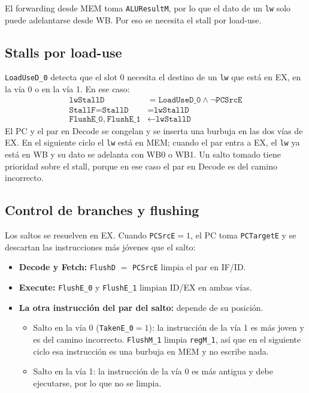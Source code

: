 \documentclass[12pt,a4paper]{article}
\begin{document}
El forwarding desde MEM toma \texttt{ALUResultM}, por lo que el dato de un \texttt{lw} solo puede adelantarse desde WB. Por eso se necesita el stall por load-use.

\subsection{Stalls por load-use}

\texttt{LoadUseD\_0} detecta que el slot 0 necesita el destino de un \texttt{lw} que está en EX, en la vía 0 o en la vía 1. En ese caso:
\begin{align}
\texttt{lwStallD} &= \texttt{LoadUseD\_0} \land \lnot\texttt{PCSrcE} \\
\texttt{StallF} = \texttt{StallD} &= \texttt{lwStallD} \\
\texttt{FlushE\_0},\ \texttt{FlushE\_1} &\leftarrow \texttt{lwStallD}
\end{align}
El PC y el par en Decode se congelan y se inserta una burbuja en las dos vías de EX. En el siguiente ciclo el \texttt{lw} está en MEM; cuando el par entra a EX, el \texttt{lw} ya está en WB y su dato se adelanta con WB0 o WB1. Un salto tomado tiene prioridad sobre el stall, porque en ese caso el par en Decode es del camino incorrecto.

\subsection{Control de branches y flushing}

Los saltos se resuelven en EX. Cuando \texttt{PCSrcE}$=1$, el PC toma \texttt{PCTargetE} y se descartan las instrucciones más jóvenes que el salto:

\begin{itemize}
    \item \textbf{Decode y Fetch:} \texttt{FlushD} $=$ \texttt{PCSrcE} limpia el par en IF/ID.
    \item \textbf{Execute:} \texttt{FlushE\_0} y \texttt{FlushE\_1} limpian ID/EX en ambas vías.
    \item \textbf{La otra instrucción del par del salto:} depende de su posición.
    \begin{itemize}
        \item Salto en la vía 0 (\texttt{TakenE\_0}$=1$): la instrucción de la vía 1 es más joven y es del camino incorrecto. \texttt{FlushM\_1} limpia \texttt{regM\_1}, así que en el siguiente ciclo esa instrucción es una burbuja en MEM y no escribe nada.
        \item Salto en la vía 1: la instrucción de la vía 0 es más antigua y debe ejecutarse, por lo que no se limpia.
    \end{itemize}
\end{itemize}
\end{document}
